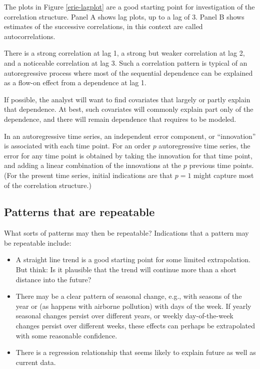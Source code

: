\documentclass{tufte-book}\usepackage[]{graphicx}\usepackage[]{color}
\begin{document}
The plots in Figure \ref{erie-lagplot} are a good starting point for
investigation of the correlation structure.  Panel A shows lag plots,
up to a lag of 3.  Panel B shows estimates of the successive
correlations, in this context are called autocorrelations.

There is a strong correlation at lag 1, a strong but weaker
correlation at lag 2, and a noticeable correlation at lag 3.  Such
a correlation pattern is typical of an autoregressive process where
most of the sequential dependence can be explained as a flow-on
effect from a dependence at lag 1.

If possible, the analyst will want to find covariates
that largely or partly explain that dependence.  At best, such
covariates will commonly explain part only of the dependence,
and there will remain dependence that requires to be modeled.

In an autoregressive time series, an  independent error component, or ``innovation'' is
associated with each time point. For an order $p$ autoregressive time
series, the error for any time point is obtained by taking the
innovation for that time point, and adding a linear combination of the
innovations at the $p$ previous time points.  (For the present time
series, initial indications are that $p=1$ might capture most of the
correlation structure.)

\subsection{Patterns that are repeatable}


What sorts of patterns may then be repeatable?  Indications that a
pattern may be repeatable include:
\begin{itemize}
\item A straight line trend is a good starting point for some
  limited extrapolation. But think: Is it plausible that the trend
  will continue more than a short distance into the future?
\item There may be a clear pattern of seasonal change, e.g.,
with seasons of the year or (as happens with airborne pollution)
with days of the week. If yearly seasonal changes persist over
different years, or weekly day-of-the-week changes persist over
different weeks, these effects can perhaps be extrapolated with
some reasonable confidence.
\item There is a regression relationship that seems likely to
explain future as well as current data.
\end{itemize}
\end{document}
